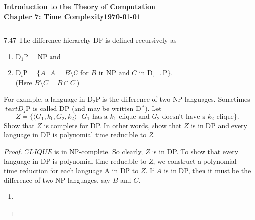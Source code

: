 \documentclass[11pt]{article}
\newcommand{\dated}{\today}
\begin{document}
\textbf{Introduction to the Theory of
Computation}\hfill\textbf{\myname}\\[0.01in]
\textbf{Chapter 7: Time Complexity}\hfill\textbf{\dated}\\
\smallskip\hrule\bigskip

\begin{problem}{7.47}
The difference hierarchy DP is defined recursively as

\begin{enumerate}[label=\alph*.]
\item $\text{D}_{1}\text{P} = \text{NP}$ and
\item $\text{D}_{i}\text{P} = \{A \ | \ A = B \setminus C \text{ for } B \text{ in NP and } C \text{ in } \text{D}_{i-1}\text{P}\}$. \\ (Here $B \setminus C = B \cap \overline{C}.$)
\end{enumerate}
For example, a language in $\text{D}_{2}\text{P}$ is the difference of two NP languages. Sometimes $\
text{D}_{2}\text{P}$ is called DP (and may be written $\text{D}^\text{P}$). Let
\[
Z = \{\langle G_1, k_1, G_2, k_2 \rangle \ | \ G_1 \text{ has a } k_{1}\text{-clique and } G_2 \text{ doesn't have a } k_{2} \text{-clique}\}.
\]
Show that $Z$ is complete for DP. In other words, show that $Z$ is in DP and every language in DP is polynomial time reducible to $Z$.
\end{problem}

\begin{proof}
$CLIQUE$ is in NP-complete. So clearly, $Z$ is in DP. To show that every language in DP is polynomial time reducible to $Z$, we construct a polynomial time reduction for each language A in DP to $Z$. If $A$ is in DP, then it must be the difference of two NP languages, say $B$ and $C$.
\begin{enumerate}
\item 
\end{enumerate}
\end{proof}
\end{document}
